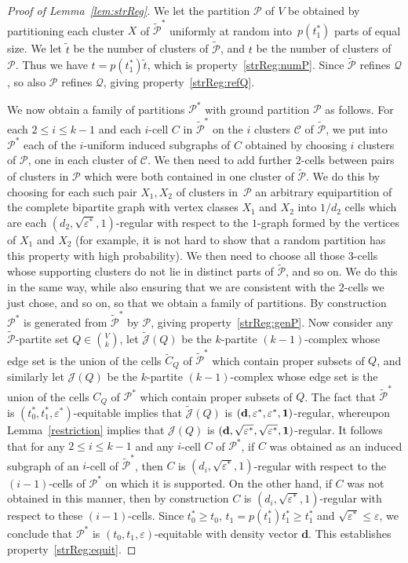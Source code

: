\documentclass[12pt,a4paper]{amsart}
\let\eps\varepsilon
\newcommand{\cJ}{\mathcal{J}}
\newcommand{\Part}{\mathcal{P}}
\newcommand{\Qart}{\mathcal{Q}}
\begin{document}
\begin{proof}[Proof of Lemma~\ref{lem:strReg}]
We let the partition $\Part$ of $V$ be obtained by partitioning each cluster $X$ of $\tilde{\Part}^*$ uniformly at random into~$p(t_1^*)$ parts of equal size. We let $\tilde{t}$ be the number of
clusters of $\tilde{\Part}$, and $t$ be the number of clusters of
$\Part$. Thus we have $t=p(t_1^*)\tilde{t}$, which is
property~\ref{strReg:numP}. Since $\tilde{\Part}$ refines $\Qart$, so also
$\Part$ refines $\Qart$, giving property~\ref{strReg:refQ}. 

We now obtain a
family of partitions $\Part^*$ with ground partition $\Part$ as follows. For
each $2\le i\le k-1$ and each $i$-cell $C$ in $\tilde{\Part}^*$ on the
$i$ clusters $\mathcal{C}$ of $\tilde{\Part}$, we put into $\Part^*$ each
of the $i$-uniform induced subgraphs of $C$ obtained by choosing $i$ clusters of
$\Part$, one in each cluster of $\mathcal{C}$.
We then need to add further $2$-cells between pairs of clusters in $\Part$
which were both contained in one cluster of $\tilde{\Part}$. We do this by
choosing for each such pair $X_1,X_2$ of clusters in~$\Part$ an arbitrary
equipartition of the complete bipartite graph with vertex classes $X_1$ and $X_2$ into $1/d_2$ cells which are each
$(d_2,\sqrt{\eps^*},1)$-regular with respect to the $1$-graph formed by the vertices of $X_1$ and $X_2$ (for example, it is not hard to show that a random partition has this property with high probability). We then need to choose all those $3$-cells whose supporting
clusters do not lie in distinct parts of $\tilde{\Part}$, and so on. We do this in the same
way, while also ensuring that we are consistent with the $2$-cells we just
chose, and so on, so that we obtain a family of partitions. By
construction $\Part^*$ is generated from $\tilde{\Part}^*$ by $\Part$,
giving property~\ref{strReg:genP}. Now consider any $\tilde{\Part}$-partite set $Q \in \binom{V}{k}$, let $\tilde{\cJ}(Q)$ be the $k$-partite $(k-1)$-complex whose edge set is the union of the cells $\tilde{C}_Q$ of $\tilde{\Part}^*$ which contain proper subsets of $Q$, and similarly let $\cJ(Q)$ be the $k$-partite $(k-1)$-complex whose edge set is the union of the cells $C_Q$ of $\Part^*$ which contain proper subsets of $Q$. The fact that $\tilde{\Part}^*$ is $(t_0^*, t_1^*, \eps^*)$-equitable implies that $\tilde{\cJ}(Q)$ is $(\bf{d}, \eps^*, \eps^*, 1)$-regular, whereupon Lemma~\ref{restriction} implies that $\cJ(Q)$ is $(\bf{d}, \sqrt{\eps^*}, \sqrt{\eps^*}, 1)$-regular. It follows that for any $2 \leq i \leq k-1$ and any $i$-cell $C$ of $\Part^*$, if $C$ was obtained as an induced subgraph of an
$i$-cell of $\tilde{\Part}^*$, then $C$ is $(d_i,\sqrt{\eps^*},1)$-regular with respect to the $(i-1)$-cells of $\Part^*$ on which it is supported. On the other hand, if $C$ was not obtained in this manner, then by construction $C$ is $(d_i,\sqrt{\eps^*},1)$-regular with respect to these $(i-1)$-cells. Since $t_0^*\ge t_0$, $t_1=p(t_1^*)t_1^*\ge t_1^*$ and
$\sqrt{\eps^*}\le\eps$, we conclude that $\Part^*$ is
$(t_0,t_1,\eps)$-equitable with density vector $\mathbf{d}$. This
establishes property~\ref{strReg:equit}.


\end{proof}
\end{document}
